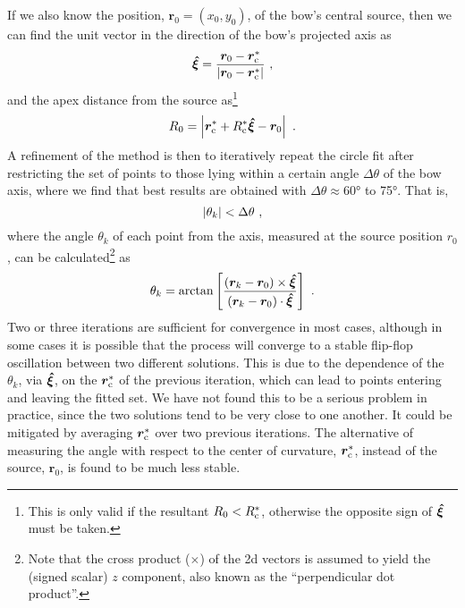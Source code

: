 If we also know the position, \(\bm{r}_0 = (x_0, y_0)\), of the bow's
central source, then we can find the unit vector in the direction of
the bow's projected axis as
\begin{equation}
  \label{eq:rcurv-axis-vector}
  \bm{\hat{\xi}} = \frac {\bm{r}_0 - \bm{r}_{\mathrm{c}}^*} { \lvert\bm{r}_0 - \bm{r}_{\mathrm{c}}^*\rvert} \ , 
\end{equation}
and the apex distance from the source as\footnote{%
  This is only valid if the resultant \(R_0 < R_{\mathrm{c}}^*\), otherwise
  the opposite sign of \(\bm{\hat{\xi}}\) must be taken.}
\begin{equation}
  \label{eq:rcurv-apex-distance}
  R_0 = \Abs{\bm{r}_{\C}^* + R_{\C}^* \uvec{\xi} - \bm{r}_0} \ .
\end{equation}
A refinement of the method is then to iteratively repeat the circle
fit after restricting the set of points to those lying within a
certain angle \(\Delta\theta\) of the bow axis, where we find that best results
are obtained with \(\Delta\theta \approx \ang{60}\) to \ang{75}.  That is, 
\begin{equation}
  \label{eq:rcurv-delta-theta}
  \left\lvert\theta_k\right\rvert < \Delta\theta \ , 
\end{equation}
where the angle \(\theta_k\) of each point from the axis, measured at the
source position \(r_0\), can be calculated\footnote{%
  Note that the cross product (\(\times\)) of the 2d vectors is assumed to
  yield the (signed scalar) \(z\) component, also known as the
  ``perpendicular dot product''.} %
as
\begin{equation}
  \label{eq:rcurv-theta-k}
  \theta_k = \arctan \left[  
    \frac{\left( \bm{r}_k - \bm{r}_0 \right) \times \bm{\hat{\xi}}}
    {\left( \bm{r}_k - \bm{r}_0 \right) \cdot \bm{\hat{\xi}}}
  \right] \ .
\end{equation}
Two or three iterations are sufficient for convergence in most cases,
although in some cases it is possible that the process will converge
to a stable flip-flop oscillation between two different solutions.
This is due to the dependence of the \(\theta_k\), via \(\bm{\hat{\xi}}\), on
the \(\bm{r}_{\mathrm{c}}^*\) of the previous iteration, which can lead to
points entering and leaving the fitted set.  We have not found this to
be a serious problem in practice, since the two solutions tend to be
very close to one another.  It could be mitigated by averaging
\(\bm{r}_{\mathrm{c}}^*\) over two previous iterations.  The alternative of
measuring the angle with respect to the center of curvature,
\(\bm{r}_{\mathrm{c}}^*\), instead of the source, \(\bm{r}_0\), is found to be
much less stable.

